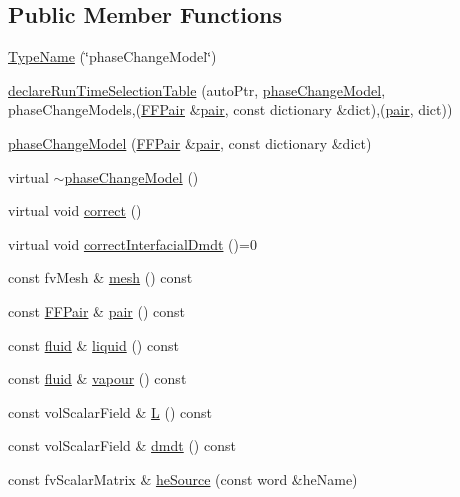 \subsection*{Public Member Functions}
\begin{DoxyCompactItemize}
\item 
\hyperlink{classFoam_1_1phaseChangeModel_a4c1ea440c2a0212fe2b5d2475911fc1e}{Type\+Name} (\char`\"{}phase\+Change\+Model\char`\"{})
\item 
\hyperlink{classFoam_1_1phaseChangeModel_a635dec53aec936a330f79b517549fad3}{declare\+Run\+Time\+Selection\+Table} (auto\+Ptr, \hyperlink{classFoam_1_1phaseChangeModel}{phase\+Change\+Model}, phase\+Change\+Models,(\hyperlink{classFoam_1_1FFPair}{F\+F\+Pair} \&\hyperlink{classFoam_1_1phaseChangeModel_a826deac453e9ba7c6fcda90d7b6b7709}{pair}, const dictionary \&dict),(\hyperlink{classFoam_1_1phaseChangeModel_a826deac453e9ba7c6fcda90d7b6b7709}{pair}, dict))
\item 
\hyperlink{classFoam_1_1phaseChangeModel_a300cf8460a39408081ad845c806f59f0}{phase\+Change\+Model} (\hyperlink{classFoam_1_1FFPair}{F\+F\+Pair} \&\hyperlink{classFoam_1_1phaseChangeModel_a826deac453e9ba7c6fcda90d7b6b7709}{pair}, const dictionary \&dict)
\item 
virtual \hyperlink{classFoam_1_1phaseChangeModel_afc700336202652f0f8dddb9617cbf90f}{$\sim$phase\+Change\+Model} ()
\item 
virtual void \hyperlink{classFoam_1_1phaseChangeModel_a3ae44b28050c3aa494c1d8e18cf618c1}{correct} ()
\item 
virtual void \hyperlink{classFoam_1_1phaseChangeModel_a86dbc75d58cb99c2c3597abb0c7bb91c}{correct\+Interfacial\+Dmdt} ()=0
\item 
const fv\+Mesh \& \hyperlink{classFoam_1_1phaseChangeModel_a470f06cfb9b6ee887cd85d63de275607}{mesh} () const
\item 
const \hyperlink{classFoam_1_1FFPair}{F\+F\+Pair} \& \hyperlink{classFoam_1_1phaseChangeModel_a826deac453e9ba7c6fcda90d7b6b7709}{pair} () const
\item 
const \hyperlink{classFoam_1_1fluid}{fluid} \& \hyperlink{classFoam_1_1phaseChangeModel_a8a45a422be431da8423bc1d5cb290ca7}{liquid} () const
\item 
const \hyperlink{classFoam_1_1fluid}{fluid} \& \hyperlink{classFoam_1_1phaseChangeModel_a6f06ed151635e5eddf72f9c23b6854bb}{vapour} () const
\item 
const vol\+Scalar\+Field \& \hyperlink{classFoam_1_1phaseChangeModel_abe53da7ab6885a0c606832841d7bb49f}{L} () const
\item 
const vol\+Scalar\+Field \& \hyperlink{classFoam_1_1phaseChangeModel_a918f3d5a64d7cf4215c6429757e28486}{dmdt} () const
\item 
const fv\+Scalar\+Matrix \& \hyperlink{classFoam_1_1phaseChangeModel_af01666438168c59e8b9fc12789b81c37}{he\+Source} (const word \&he\+Name)
\end{DoxyCompactItemize}
